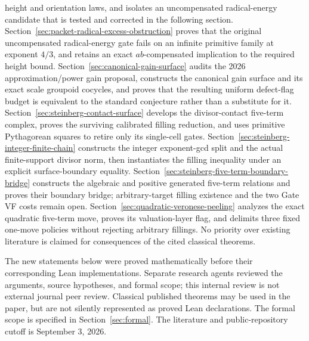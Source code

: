\documentclass[11pt]{amsart}
\theoremstyle{definition}
\theoremstyle{remark}
\begin{document}
height and orientation laws, and isolates an uncompensated radical-energy
candidate that is tested and corrected in the following section.
Section~\ref{sec:packet-radical-excess-obstruction} proves that the original
uncompensated radical-energy gate fails on an infinite primitive family at
exponent $4/3$, and retains an exact $ab$-compensated implication to the
required height bound.
Section~\ref{sec:canonical-gain-surface} audits the 2026 approximation/power
gain proposal, constructs the canonical gain surface and its exact scale
groupoid cocycles, and proves that the resulting uniform defect-flag budget is
equivalent to the standard conjecture rather than a substitute for it.
Section~\ref{sec:steinberg-contact-surface} develops the divisor-contact
five-term complex, proves the surviving calibrated filling reduction, and
uses primitive Pythagorean squares to retire only its single-cell gates.
Section~\ref{sec:steinberg-integer-finite-chain} constructs the integer
exponent-gcd split and the actual finite-support divisor norm, then
instantiates the filling inequality under an explicit surface-boundary
equality.
Section~\ref{sec:steinberg-five-term-boundary-bridge} constructs the algebraic
and positive generated five-term relations and proves their boundary bridge;
arbitrary-target filling existence and the two Gate VF costs remain open.
Section~\ref{sec:quadratic-veronese-peeling} analyzes the exact quadratic
five-term move, proves its valuation-layer flag, and delimits three fixed
one-move policies without rejecting arbitrary fillings.
No priority over existing literature is
claimed for consequences of the cited classical theorems.

The new statements below were proved mathematically before their
corresponding Lean implementations. Separate research agents reviewed the
arguments, source hypotheses, and formal scope; this internal review is
not external journal peer review. Classical published
theorems may be used in the paper, but are not silently represented as
proved Lean declarations. The formal scope is specified in
Section~\ref{sec:formal}. The literature and public-repository cutoff is
September 3, 2026.
\end{document}
